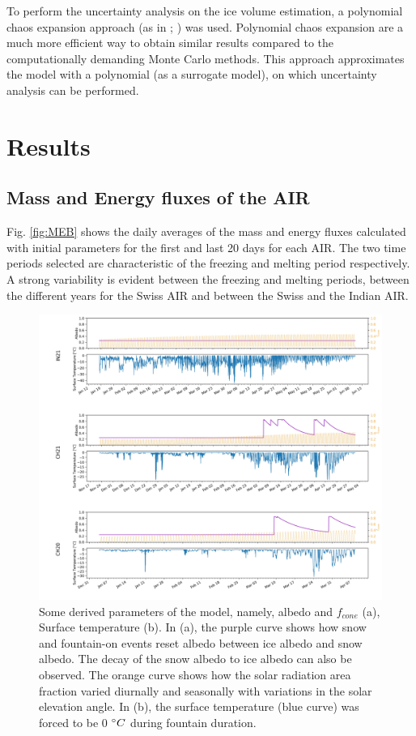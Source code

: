 \documentclass[utf8]{frontiersSCNS} %
\begin{document}
To perform the uncertainty analysis on the ice volume estimation, a polynomial chaos expansion approach (as in
\cite{uncertainpy_2018}; \cite{Xiu_2005}) was used. Polynomial chaos expansion are a much more efficient way to obtain
similar results compared to the computationally demanding Monte Carlo methods. This approach approximates the model with
a polynomial (as a surrogate model), on which uncertainty analysis can be performed.

\section{Results}

\subsection{Mass and Energy fluxes of the AIR}

Fig. \ref{fig:MEB} shows the daily averages of the mass and energy fluxes calculated with initial parameters for the
first and last 20 days for each AIR. The two time periods selected are characteristic of the freezing and melting period
respectively. A strong variability is evident between the freezing and melting periods, between the different years for
the Swiss AIR and between the Swiss and the Indian AIR.

\begin{figure}
	\begin{center}
		\includegraphics[width=\linewidth]{Figures/albedo.jpg}
	\end{center}
	\caption{Some derived parameters of the model, namely, albedo and $f_{cone}$ (a), Surface temperature (b). In
		(a), the purple curve shows how snow and fountain-on events reset albedo between ice albedo and snow albedo.  The
		decay of the snow albedo to ice albedo can also be observed. The orange curve shows how the solar radiation area
		fraction varied diurnally and seasonally with variations in the solar elevation angle. In (b), the surface
		temperature (blue curve) was forced to be 0 $\degree C$ during fountain duration.} 
		\label{fig:albedo} 
		\end{figure}
		
\end{document}
